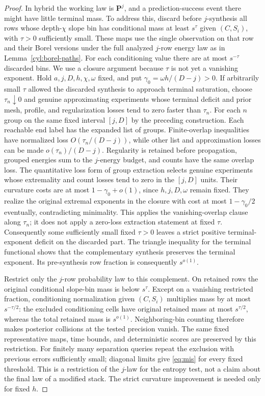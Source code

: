 \begin{proof}
In hybrid the working law is $\mathbf P^j$, and a prediction-success
event there might have little terminal mass.  To address this,
discard before $j$-synthesis all rows whose depth-$\chi$ slope bin
has conditional mass at least $s^\tau$ given $(C,S_i)$, with
$\tau>0$ sufficiently small.  These maps use the single observation
on that row and their Borel versions under the full analyzed $j$-row
energy law
as in Lemma~\ref{cyl:borel-paths}.  For each conditioning value there are at most
$s^{-\tau}$ discarded bins.  We use a closure argument because
$\tau$ is not yet a vanishing exponent.  Hold
$a,j,D,h,\chi,\omega$ fixed, and put
$\gamma_0=\omega h/(D-j)>0$.  If arbitrarily small $\tau$
allowed the discarded synthesis to approach terminal saturation,
choose $\tau_n\downarrow0$ and genuine approximating experiments
whose terminal deficit and prior mesh, profile, and regularization
losses tend to zero faster than $\tau_n$.  For each $n$ group
on the same fixed interval $[j,D]$ by the preceding construction.
Each reachable end label has the expanded list of groups.
Finite-overlap inequalities have normalized loss
$O(\tau_n/(D-j))$, while other list and approximation losses
can be made $o(\tau_n)/(D-j)$.  Regularity is retained before
propagation, grouped energies sum to the $j$-energy budget,
and counts have the same overlap loss.  The quantitative loss
form of group extraction selects genuine experiments whose
extremality and count losses tend to zero in the $[j,D]$ units.
Their curvature costs are at most $1-\gamma_0+o(1)$, since
$h,j,D,\omega$ remain fixed.  They realize the original extremal
exponents in the closure with cost at most $1-\gamma_0/2$
eventually, contradicting minimality.  This applies the
vanishing-overlap clause along $\tau_n$; it does not apply a
zero-loss extraction statement at fixed $\tau$.
Consequently some sufficiently small fixed $\tau>0$ leaves a
strict positive terminal-exponent deficit on the discarded part.
The triangle inequality for the terminal
functional shows that the complementary synthesis preserves the
terminal exponent.  Its pre-synthesis row fraction is consequently
$s^{o(1)}$.

Restrict only the $j$-row probability law to this complement.
On retained rows the original conditional slope-bin mass is below
$s^\tau$.  Except on a vanishing restricted fraction, conditioning
normalization given $(C,S_i)$ multiplies mass by at most
$s^{-\tau/2}$: the excluded conditioning cells have original
retained mass at most $s^{\tau/2}$, whereas the total retained
mass is $s^{o(1)}$.  Neighboring-bin counting therefore makes
posterior collisions at the tested precision vanish.  The same
fixed representative maps, time bounds, and deterministic scores
are preserved by this restriction.  For finitely many separation
queries repeat the exclusion with previous errors sufficiently
small; diagonal limits give \eqref{eq:mis} for every fixed
threshold.  This is a restriction of the $j$-law for the entropy
test, not a claim about the final law of a modified stack.  The
strict curvature improvement is needed only for fixed $h$.


\end{proof}
